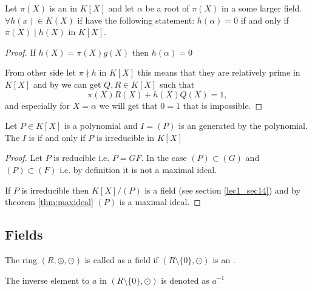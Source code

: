 \begin{appendices}
\begin{theorem}
  Let $\pi(X)$ is an  in $K\left[X\right]$ and let
  $\alpha$ be a root of $\pi(X)$ in a some larger field.
  $\forall h(x) \in K\left(X\right)$ if have the following statement:
  $h\left(\alpha\right) = 0$ if and only if $\pi(X) \mid h(X)$ in
  $K\left[X\right]$.
  \begin{proof}
    If $h(X) = \pi(X) g(X)$ then $h(\alpha) = 0$

    From other side let $\pi \nmid h$ in $K\left[X\right]$ this means
    that they are relatively prime in $K\left[X\right]$ and by
     we can get $Q,R \in K\left[X\right]$ such
    that
    \[
    \pi(X) R(X) + h(X) Q(X) = 1,
    \]
    and especially for $X = \alpha$ we will get that $0 = 1$ that is
    impossible. 
  \end{proof}
  \label{thm:irreduciblediv}
\end{theorem}

\begin{theorem}
  Let $P \in K\left[X\right]$ is a polynomial and $I = \left(P\right)$ is
  an  generated by the polynomial. The $I$ is
   if and only if $P$ is irreducible in
  $K\left[X\right]$
  \begin{proof}
    Let $P$ is reducible i.e. $P = G F$. In the case $(P) \subset (G)$
    and $(P) \subset (F)$ i.e. by definition it is not a maximal
    ideal.

    If $P$ is irreducible then $K\left[X\right]/(P)$ is a field (see
    section \ref{lec1_sec14}) and by theorem \ref{thm:maxideal} $(P)$
    is a maximal ideal.
  \end{proof}
  \label{thm:irreducibleideal}
\end{theorem}

\subsection{Fields}

\begin{definition}[Field]
  The ring $\left(R, \oplus, \odot\right)$ is called as a field if
  $\left(R \setminus \{0\}, \odot\right)$ is an .

  The inverse element to $a$ in
  $\left(R \setminus\{0\}, \odot\right)$ is denoted as $a^{-1}$
  \label{def:field}
\end{definition}


\end{appendices}
